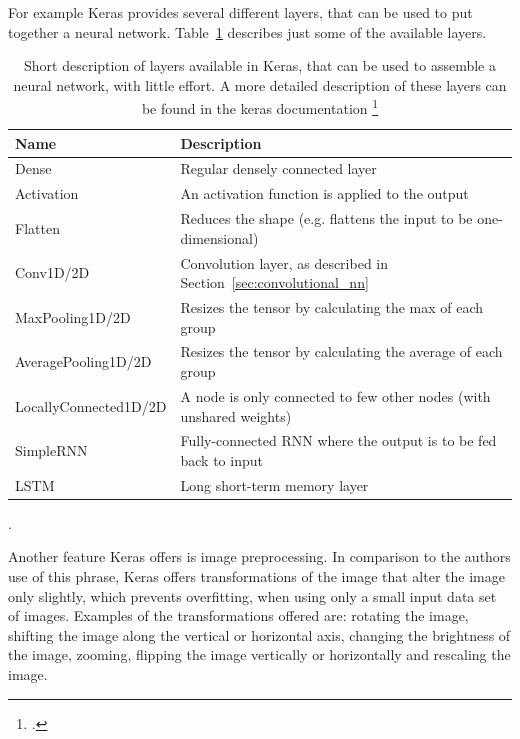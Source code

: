 For example Keras provides several different layers, that can be used to put together a neural network. Table~\ref{tab:methodology_tensorflow_alternativesToTensorflow_kerasLayers} describes just some of the available layers.

\begin{center}
	\begin{table}[h!]
		\begin{tabular}{| l | l |}
			\hline
			\bfseries Name & \bfseries Description \\
			\hline
			Dense & Regular densely connected layer \\
			\hline
			Activation & An activation function is applied to the output \\
			\hline
			Flatten & Reduces the shape (e.g. flattens the input to be one-dimensional) \\
			\hline
			Conv1D/2D & Convolution layer, as described in Section~\ref{sec:convolutional_nn} \\
			\hline
			MaxPooling1D/2D & Resizes the tensor by calculating the max of each group \\
			\hline
			AveragePooling1D/2D & Resizes the tensor by calculating the average of each group \\
			\hline
			LocallyConnected1D/2D & A node is only connected to few other nodes (with unshared weights) \\
			SimpleRNN & Fully-connected RNN where the output is to be fed back to input \\
			LSTM & Long short-term memory layer \\
			\hline
		\end{tabular}
		\caption{Short description of layers available in Keras, that can be used to assemble a neural network, with little effort. A more detailed description of these layers can be found in the keras documentation \footcite{kerasDocumentation}}.
		\label{tab:methodology_tensorflow_alternativesToTensorflow_kerasLayers}
	\end{table}
\end{center}

Another feature Keras offers is image preprocessing. In comparison to the authors use of this phrase, Keras offers transformations of the image that alter the image only slightly, which prevents overfitting, when using only a small input data set of images. Examples of the transformations offered are: rotating the image, shifting the image along the vertical or horizontal axis, changing the brightness of the image, zooming, flipping the image vertically or horizontally and rescaling the image.

